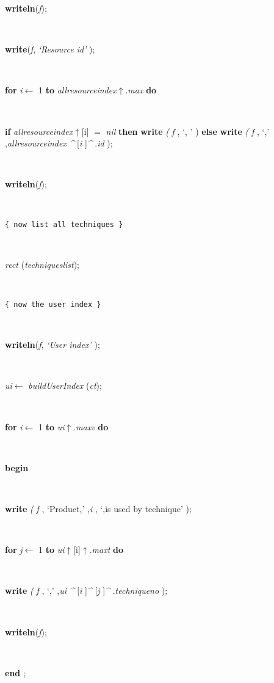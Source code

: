 \begin{tabbing}
\parbox{14cm}{\textsf{\textbf{writeln}(\textit{f})}; }\\
\parbox{14cm}{\textsf{\textbf{write}(\textit{f}, \textit{\textrm{\textup { `Resource id' } }})}; }\\
\+\parbox{14cm}{\textsf {\textbf {for } \textsf{\textit{i}$\leftarrow$ 1} \textbf{ to } \textsf{\textit{allresourceindex}$\uparrow$.\textit{max}} \textbf{ do } }}\\
\-\parbox{14cm}{\textsf {\textbf {if } \textsf{\textit{allresourceindex}$\uparrow$\textit{}[i] $=$ \textit{nil}} \textbf{ then } \textsf{ \textbf{write}  \textit{(} \textit{f} ,\textrm{\textup { `, ' } }) } \textbf{ else } \textsf{ \textbf{write} \textit{(} \textit{f} ,\textrm{\textup { `,' } },\textit{allresourceindex} \textit{\^{}} [\textit{i} ]\textit{\^{}} .\textit{id} );}}}\\
\parbox{14cm}{\textsf{\textbf{writeln}(\textit{f})}; }\\
\parbox{14cm}{\texttt{\small{\{ now list all techniques \}}}}\\
\parbox{14cm}{\textsf{\textit{rect} (\textit{techniqueslist})}; }\\
\parbox{14cm}{\texttt{\small{\{ now the user index \}}}}\\
\parbox{14cm}{\textsf{\textbf{writeln}(\textit{f}, \textit{\textrm{\textup { `User index' } }})}; }\\
\parbox{14cm}{\textsf{\textit{ui}$\leftarrow$ \textit{buildUserIndex} (\textit{ct})}; }\\
\+\parbox{14cm}{\textsf {\textbf {for } \textsf{\textit{i}$\leftarrow$ 1} \textbf{ to } \textsf{\textit{ui}$\uparrow$.\textit{maxv}} \textbf{ do } }}\\
\<\parbox{14cm}{\textsf{\textbf{begin} }}\\
\parbox{14cm}{\textsf{\textbf{write} \textit{(} \textit{f} ,\textrm{\textup { `Product,' } },\textit{i} ,\textrm{\textup { `,is used by technique' } });}}\\
\+\parbox{14cm}{\textsf {\textbf {for } \textsf{\textit{j}$\leftarrow$ 1} \textbf{ to } \textsf{\textit{ui}$\uparrow$\textit{}[i]$\uparrow$.\textit{maxt}} \textbf{ do } }}\\
\-\parbox{14cm}{\textsf{\textbf{write} \textit{(} \textit{f} ,\textrm{\textup { `,' } },\textit{ui} \textit{\^{}} [\textit{i} ]\textit{\^{}} [\textit{j} ]\textit{\^{}} .\textit{techniqueno} );}}\\
\parbox{14cm}{\textsf{\textbf{writeln}(\textit{f})}; }\\
\<\-\parbox{14cm}{\textsf{\textbf{end} ;}}\\

\end{tabbing}
